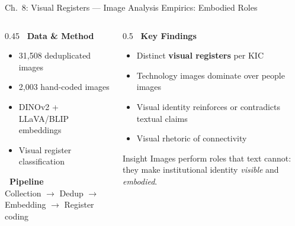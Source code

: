 \documentclass[aspectratio=169]{beamer}
\newcommand{\secmark}[1]{\hfill{\scriptsize\color{gray}#1}}
\begin{document}
\begin{frame}{Ch.~8: Visual Registers --- Image Analysis}
\secmark{Empirics: Embodied Roles}
\begin{columns}[T]
\begin{column}{0.45\textwidth}
    \textbf{\faDatabase\ Data \& Method}
    \begin{itemize}
        \item 31,508 deduplicated images
        \item 2,003 hand-coded images
        \item DINOv2 + LLaVA/BLIP embeddings
        \item Visual register classification
    \end{itemize}
    \vspace{0.5em}
    \textbf{\faCogs\ Pipeline}\\
    {\small Collection $\to$ Dedup $\to$ Embedding $\to$ Register coding}
\end{column}
\begin{column}{0.5\textwidth}
    \textbf{\faLightbulb[regular]\ Key Findings}
    \begin{itemize}
        \item Distinct \textbf{visual registers} per KIC
        \item Technology images dominate over people images
        \item Visual identity reinforces or contradicts textual claims
        \item Visual rhetoric of connectivity
    \end{itemize}
    \vspace{0.3em}
    \begin{block}{\scriptsize Insight}
        \scriptsize Images perform roles that text cannot: they make institutional identity \emph{visible} and \emph{embodied}.
    \end{block}
\end{column}
\end{columns}
\end{frame}
\end{document}
